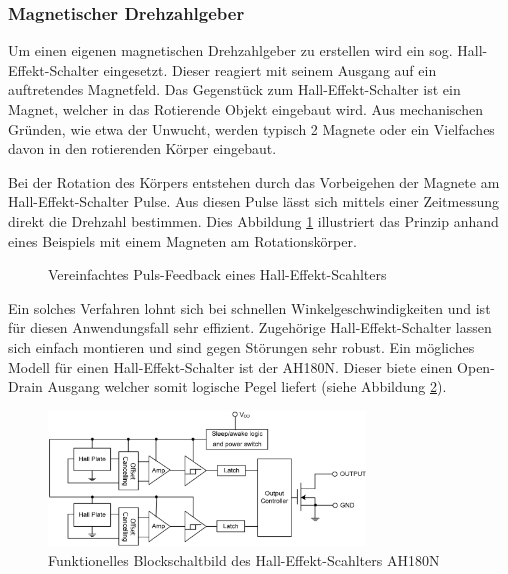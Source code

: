 \subsubsection{Magnetischer Drehzahlgeber}
Um einen eigenen magnetischen Drehzahlgeber zu erstellen wird ein
sog. Hall-Effekt-Schalter eingesetzt. Dieser reagiert mit seinem Ausgang
auf ein auftretendes Magnetfeld. Das Gegenstück zum Hall-Effekt-Schalter
ist ein Magnet, welcher in das Rotierende Objekt eingebaut wird. Aus 
mechanischen Gründen, wie etwa der Unwucht, werden typisch 2 Magnete
oder ein Vielfaches davon in den rotierenden Körper eingebaut.

Bei der Rotation des Körpers entstehen durch das Vorbeigehen der Magnete
am Hall-Effekt-Schalter Pulse. Aus diesen Pulse lässt sich mittels einer
Zeitmessung direkt die Drehzahl bestimmen. Dies Abbildung 
\ref{fig:hall-effekt-schalter} illustriert das Prinzip anhand eines
Beispiels mit einem Magneten am Rotationskörper.

\begin{figure}[h!]
	\centering
	\caption{Vereinfachtes Puls-Feedback eines Hall-Effekt-Scahlters}
	\label{fig:hall-effekt-schalter}
\end{figure}

Ein solches Verfahren lohnt sich bei schnellen Winkelgeschwindigkeiten
und ist für diesen Anwendungsfall sehr effizient. Zugehörige
Hall-Effekt-Schalter lassen sich einfach montieren und sind gegen Störungen
sehr robust. Ein mögliches Modell für einen Hall-Effekt-Schalter ist der
AH180N. Dieser biete einen Open-Drain Ausgang welcher somit logische Pegel
liefert (siehe Abbildung \ref{fig:AH180N_functional}).

\begin{figure}[h!]
	\centering
	\includegraphics[width=0.75\textwidth]{../../fig/motor/AH180N_functional.png}
	\caption{Funktionelles Blockschaltbild des Hall-Effekt-Scahlters AH180N}
	\label{fig:AH180N_functional}
\end{figure}

